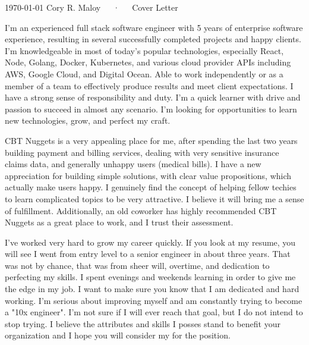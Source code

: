 \documentclass[11pt, a4paper]{setup-class}
\begin{document}
\makecvheader[R]

\makecvfooter
  {\today}
  {Cory R. Maloy~~~·~~~Cover Letter}
  {}

\makelettertitle

\begin{cvletter}

I'm an experienced full stack software engineer with 5 years of enterprise software experience, resulting in several successfully completed projects and happy clients. I'm knowledgeable in most of today’s popular technologies, especially React, Node, Golang, Docker, Kubernetes, and various cloud provider APIs including AWS, Google Cloud, and Digital Ocean. Able to work independently or as a member of a team to effectively produce results and meet client expectations. I have a strong sense of responsibility and duty. I'm a quick learner with drive and passion to succeed in almost any scenario. I’m looking for opportunities to learn new technologies, grow, and perfect my craft. 

CBT Nuggets is a very appealing place for me, after spending the last two years building payment and billing services, dealing with very sensitive insurance claims data, and generally unhappy users (medical bills). I have a new appreciation for building simple solutions, with clear value propositions, which actually make users happy. I genuinely find the concept of helping fellow techies to learn complicated topics to be very attractive. I believe it will bring me a sense of fulfillment. Additionally, an old coworker has highly recommended CBT Nuggets as a great place to work, and I trust their assessment.

I've worked very hard to grow my career quickly. If you look at my resume, you will see I went from entry level to a senior engineer in about three years. That was not by chance, that was from sheer will, overtime, and dedication to perfecting my skills. I spent evenings and weekends learning in order to give me the edge in my job. I want to make sure you know that I am dedicated and hard working. I'm serious about improving myself and am constantly trying to become a "10x engineer". I'm not sure if I will ever reach that goal, but I do not intend to stop trying. I believe the attributes and skills I posses stand to benefit your organization and I hope you will consider my for the position.

\end{cvletter}


\makeletterclosing
\end{document}
